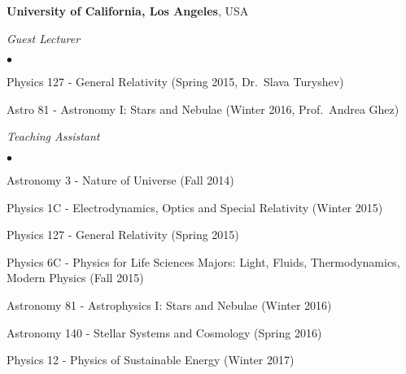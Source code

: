 \documentclass[margin, line]{res}
\newenvironment{list2}{
  \begin{list}{$\bullet$}{%
      \setlength{\itemsep}{0in}
      \setlength{\parsep}{0in} \setlength{\parskip}{0in}
      \setlength{\topsep}{0in} \setlength{\partopsep}{0in} 
      \setlength{\leftmargin}{0.2in}}}{\end{list}}
\begin{document}
\begin{resume}
	
{\bf University of California, Los Angeles}, USA



{\em Guest Lecturer} \hfill {\bf}\\
\begin{list2}
	\item Physics 127 - General Relativity (Spring 2015, Dr.~Slava Turyshev)
	\item Astro 81 - Astronomy I: Stars and Nebulae (Winter 2016, Prof.~Andrea Ghez)
\end{list2}
	
{\em Teaching Assistant} \hfill {}\\
\begin{list2}
	\item Astronomy 3 - Nature of Universe (Fall 2014)
	\item Physics 1C - Electrodynamics, Optics and Special Relativity (Winter 2015)
	\item Physics 127 - General Relativity (Spring 2015)
	\item Physics 6C - Physics for Life Sciences Majors: Light, Fluids, Thermodynamics, Modern Physics (Fall 2015)
	\item Astronomy 81 - Astrophysics I: Stars and Nebulae (Winter 2016)
	\item Astronomy 140 - Stellar Systems and Cosmology (Spring 2016)
	\item Physics 12 - Physics of Sustainable Energy (Winter 2017)
\end{list2}





\end{resume}
\end{document}

